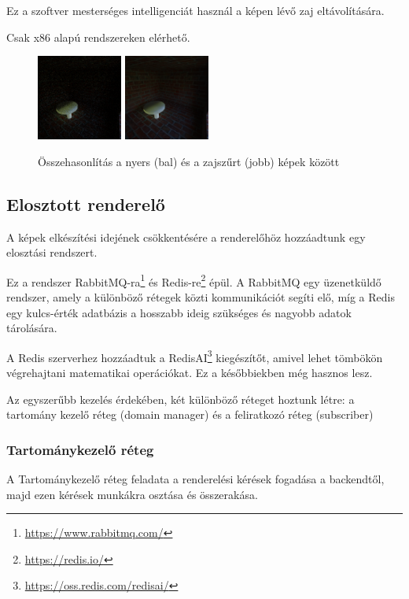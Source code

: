 Ez a szoftver mesterséges intelligenciát használ a képen lévő zaj eltávolítására.

Csak x86 alapú rendszereken elérhető.

\begin{figure}[H]
    \centering
    \includegraphics[width=0.25\textwidth]{parts/developer-documentation/ray-tracer/images/raw.png}
    \includegraphics[width=0.25\textwidth]{parts/developer-documentation/ray-tracer/images/denoised.png}
    \caption{Összehasonlítás a nyers (bal) és a zajszűrt (jobb) képek között}
\end{figure}

\subsection{Elosztott renderelő}

A képek elkészítési idejének csökkentésére a renderelőhöz hozzáadtunk egy elosztási rendszert.

Ez a rendszer RabbitMQ-ra\footnote{\url{https://www.rabbitmq.com/}} és Redis-re\footnote{\url{https://redis.io/}} épül. A RabbitMQ egy üzenetküldő rendszer, amely a különböző rétegek közti kommunikációt segíti elő, míg a Redis egy kulcs-érték adatbázis a hosszabb ideig szükséges és nagyobb adatok tárolására.

A Redis szerverhez hozzáadtuk a RedisAI\footnote{\url{https://oss.redis.com/redisai/}} kiegészítőt, amivel lehet tömbökön végrehajtani matematikai operációkat. Ez a későbbiekben még hasznos lesz.

Az egyszerűbb kezelés érdekében, két különböző réteget hoztunk létre: a tartomány kezelő réteg (domain manager) és a feliratkozó réteg (subscriber)

\subsubsection{Tartománykezelő réteg}
A Tartománykezelő réteg feladata a renderelési kérések fogadása a backendtől, majd ezen kérések munkákra osztása és összerakása.

